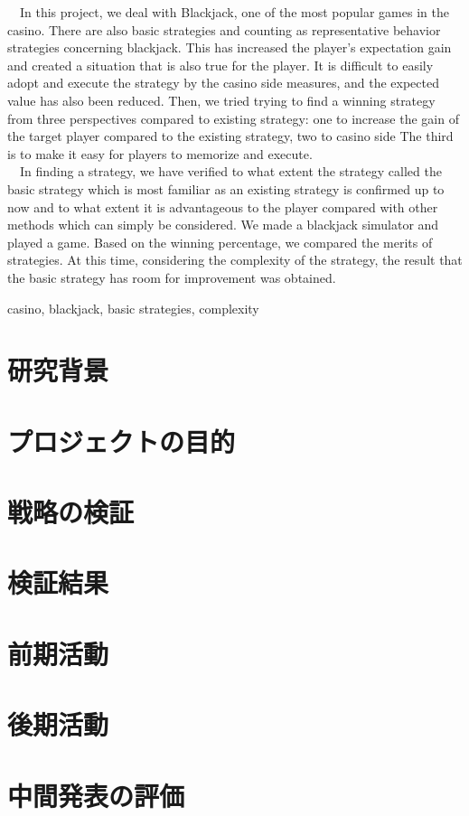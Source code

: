 \documentclass[11pt,a4paper,oneside]{jsbook}
\begin{document}
\begin{eabstract} 
\ \ In this project, we deal with Blackjack, one of the most popular games in the casino. There are
also basic strategies and counting as representative behavior strategies concerning blackjack. This
has increased the player's expectation gain and created a situation that is also true for the player.
 It is difficult to easily adopt and execute the strategy by the casino side measures, and the expected
  value has also been reduced. Then, we tried trying to find a winning strategy from three perspectives 
  compared to existing strategy: one to increase the gain of the target player compared to the existing 
  strategy, two to casino side The third is to make it easy for players to memorize and execute.\\
\ \ In finding a strategy, we have verified to what extent the strategy called the basic strategy which 
is most familiar as an existing strategy is confirmed up to now and to what extent it is advantageous to 
the player compared with other methods which can simply be considered. We made a blackjack simulator and 
played a game. Based on the winning percentage, we compared the merits of strategies. At this time, considering 
the complexity of the strategy, the result that the basic strategy has room for improvement was obtained.
\begin{ekeyword}
casino, blackjack, basic strategies, complexity
\end{ekeyword}
\end{eabstract}

\tableofcontents
\newpage


\chapter{研究背景}




\chapter{プロジェクトの目的}

\chapter{戦略の検証}



\chapter{検証結果}


\chapter{前期活動}

\chapter{後期活動}

\chapter{中間発表の評価}




%
%
%
%
\end{document}

